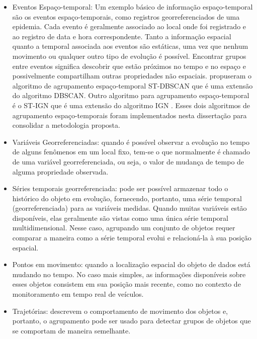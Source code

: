 \begin{itemize}
    \item Eventos Espaço-temporal: Um exemplo básico de informação espaço-temporal são os eventos espaço-temporais, como registros georreferenciados de uma epidemia. Cada evento é geralmente associado ao local onde foi registrado e ao registro de data e hora correspondente. Tanto a informação espacial quanto a temporal associada aos eventos são estáticas, uma vez que nenhum movimento ou qualquer outro tipo de evolução é possível. Encontrar grupos entre eventos significa descobrir que estão próximos no tempo e no espaço e possivelmente compartilham outras propriedades não espaciais.  propuseram o algoritmo de agrupamento espaço-temporal \acrshort{ST-DBSCAN} que é uma extensão do algoritmo DBSCAN. Outro algoritmo para agrupamento espaço-temporal é o ST-IGN que é uma extensão do algoritmo IGN \cite{ign}. Esses dois algoritmos de agrupamento espaço-temporais foram implementados nesta dissertação para consolidar a metodologia proposta.
	\item Variáveis Georreferenciadas: quando é possível observar a evolução no tempo de alguns fenômenos em um local fixo, tem-se o que normalmente é chamado de uma variável georreferenciada, ou seja, o valor de mudança de tempo de alguma propriedade observada.
	\item Séries temporais georreferenciada: pode ser possível armazenar todo o histórico do objeto em evolução, fornecendo, portanto, uma série temporal (georreferenciada) para as variáveis medidas. Quando muitas variáveis estão disponíveis, elas geralmente são vistas como uma única série temporal multidimensional. Nesse caso, agrupando um conjunto de objetos requer comparar a maneira como a série temporal evolui e relacioná-la à sua posição espacial.
	\item Pontos em movimento: quando a localização espacial do objeto de dados está mudando no tempo. No caso mais simples, as informações disponíveis sobre esses objetos consistem em sua posição mais recente, como no contexto de monitoramento em tempo real de veículos.
	\item Trajetórias: descrevem o comportamento de movimento dos objetos e, portanto, o agrupamento pode ser usado para detectar grupos de objetos que se comportam de maneira semelhante.
\end{itemize}

